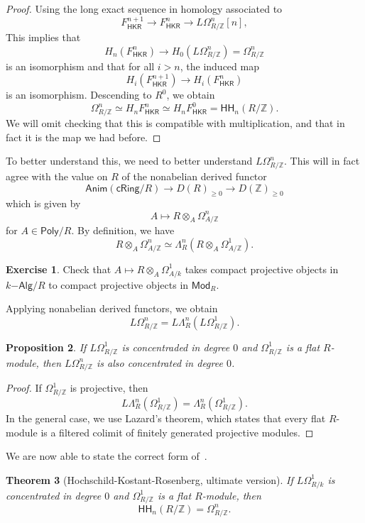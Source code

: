 \documentclass[10pt]{amsart}
\newtheorem{thm}{Theorem}[section]
\newtheorem{prop}[thm]{Proposition}
\theoremstyle{definition}
\newtheorem{exer}[thm]{Exercise}
\theoremstyle{remark}
\theoremstyle{plain}
\theoremstyle{definition}
\theoremstyle{remark}
\newcommand{\Z}{\mathbb{Z}}
\newcommand{\ms}[1]{\mathsf{#1}}
\newcommand{\1}{\mathbf{1}}
\newcommand{\2}{\mathbf{2}}
\newcommand{\3}{\mathbf{3}}
\newcommand{\HH}{\ms{HH}}
\begin{document}
\begin{proof}
    Using the long exact sequence in homology associated to
    \[ F_{\ms{HKR}}^{n+1} \to F_{\ms{HKR}}^n \to L\Omega^n_{R/\Z}[n], \]
    This implies that
    \[ H_n (F^n_{\ms{HKR}}) \to H_0(L\Omega^n_{R/\Z}) = \Omega^n_{R/\Z} \]
    is an isomorphism and that for all $i > n$, the induced map
    \[ H_i(F^{n+1}_{\ms{HKR}}) \to H_i(F^n_{\ms{HKR}}) \]
    is an isomorphism. Descending to $R^0$, we obtain
    \[ \Omega^n_{R/\Z} \simeq H_n F_{\ms{HKR}}^n \simeq H_n F^0_{\ms{HKR}} = \HH_n(R/\Z). \]
    We will omit checking that this is compatible with multiplication, and that in fact it is the map we had before.
\end{proof}

To better understand this, we need to better understand $L\Omega^n_{R/\Z}$. This will in fact agree with the value on $R$ of the nonabelian derived functor
\[ \ms{Anim}(\ms{cRing}/R) \to D(R)_{\geq 0} \to D(\Z)_{\geq 0} \]
which is given by
\[ A \mapsto R \otimes_A \Omega_{A/\Z}^n \]
for $A \in \ms{Poly}/R$. By definition, we have
\[ R \otimes_A \Omega^n_{A/\Z} \simeq \Lambda_R^n (R \otimes_A \Omega^1_{A/\Z}). \]
\begin{exer}
    Check that $A \mapsto R \otimes_A \Omega^1_{A/k}$ takes compact projective objects in $k\ms{-Alg}/R$ to compact projective objects in $\ms{Mod}_R$.
\end{exer}
Applying nonabelian derived functors, we obtain
\[ L\Omega^n_{R/\Z} = L \Lambda^n_R (L \Omega^1_{R/\Z}). \]

\begin{prop}
    If $L\Omega^1_{R/\Z}$ is concentraded in degree $0$ and $\Omega^1_{R/\Z}$ is a flat $R$-module, then $L\Omega^n_{R/\Z}$ is also concentrated in degree $0$.
\end{prop}

\begin{proof}
    If $\Omega^1_{R/\Z}$ is projective, then
    \[ L \Lambda_R^n (\Omega^1_{R/\Z}) = \Lambda^n_R (\Omega^1_{R/\Z}). \]
    In the general case, we use Lazard's theorem, which states that every flat $R$-module is a filtered colimit of finitely generated projective modules.
\end{proof}

We are now able to state the correct form of~.
\begin{thm}[Hochschild-Kostant-Rosenberg, ultimate version]\label{thm:hkr2}
    If $L\Omega^1_{R/k}$ is concentrated in degree $0$ and $\Omega^1_{R/\Z}$ is a flat $R$-module, then
    \[ \HH_n(R/\Z) = \Omega^n_{R/\Z}. \]
\end{thm}
\end{document}
